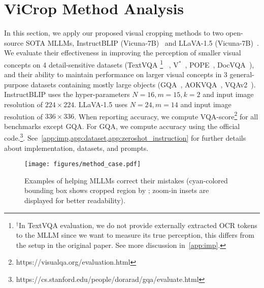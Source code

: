 \section{ViCrop Method Analysis}
\label{sec:experiments}

In this section, we apply our proposed visual cropping methods to two open-source SOTA MLLMs, InstructBLIP (Vicuna-7B)~\citep{instructblip} and LLaVA-1.5 (Vicuna-7B)~\citep{llava1.5}. We evaluate their effectiveness in improving the perception of smaller visual concepts on 4 detail-sensitive datasets (TextVQA
\footnote{$^\dagger$In TextVQA evaluation, we do not provide externally extracted OCR tokens to the MLLM since we want to measure its true perception, this differs from the setup in the original paper. See more discussion in~\cref{app:imp}.}
~\citep{textvqa}, V$^*$~\citep{v-star}, POPE~\citep{li2023pope}, DocVQA~\citep{docvqa}), and their ability to maintain performance on larger visual concepts in 3 general-purpose datasets containing mostly large objects (GQA~\citep{hudson2019gqa}, AOKVQA~\citep{schwenk2022okvqa}, VQAv2~\citep{goyal2017vqav2}). InstructBLIP uses the hyper-parameters $N=16, m=15, k=2$ and input image resolution of $224\times 224$. LLaVA-1.5 uses $N=24, m=14$ and input image resolution of $336\times 336$.  When reporting accuracy, we compute VQA-score\footnote{https://visualqa.org/evaluation.html} for all benchmarks except GQA. For GQA, we compute accuracy using the official code.\footnote{https://cs.stanford.edu/people/dorarad/gqa/evaluate.html}. See~\cref{app:imp,app:dataset,app:zeroshot_instruction} for further details about implementation, datasets, and prompts.


\begin{figure*}[t]
    \centering
    \texttt{[image: figures/method\_case.pdf]}
    \caption{Examples of \rel{} helping MLLMs correct their mistakes (cyan-colored bounding box shows cropped region by \rel{}; zoom-in insets are displayed for better readability).}
    \label{fig:crop_examples}
\end{figure*}



